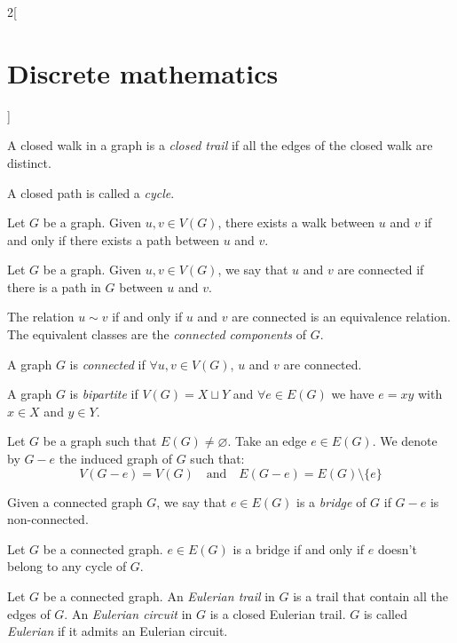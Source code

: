 \documentclass[../../../main.tex]{subfiles}
\begin{document}
\begin{multicols}{2}[\section{Discrete mathematics}]
\begin{definition}
    A closed walk in a graph is a \emph{closed trail} if all the edges of the closed walk are distinct.
  \end{definition}
  \begin{definition}
    A closed path is called a \emph{cycle}.
  \end{definition}
  \begin{prop}
    Let $G$ be a graph. Given $u,v\in V(G)$, there exists a walk between $u$ and $v$ if and only if there exists a path between $u$ and $v$.
  \end{prop}
  \begin{definition}
    Let $G$ be a graph. Given $u,v\in V(G)$, we say that $u$ and $v$ are connected if there is a path in $G$ between $u$ and $v$.
  \end{definition}
  \begin{prop}
    The relation $u\sim v$ if and only if $u$ and $v$ are connected is an equivalence relation. The equivalent classes are the \emph{connected components} of $G$.
  \end{prop}
  \begin{definition}
    A graph $G$ is \emph{connected} if $\forall u,v\in V(G)$, $u$ and $v$ are connected.
  \end{definition}
  \begin{definition}
    A graph $G$ is \emph{bipartite} if $V(G)=X\sqcup Y$ and $\forall e\in E(G)$ we have $e=xy$ with $x\in X$ and $y\in Y$.
  \end{definition}
  \begin{definition}
    Let $G$ be a graph such that $E(G)\ne\varnothing$. Take an edge $e\in E(G)$. We denote by $G-e$ the induced graph of $G$ such that: $$V(G-e)=V(G)\quad\text{and}\quad E(G-e)=E(G)\setminus\{e\}$$
  \end{definition}
  \begin{definition}
    Given a connected graph $G$, we say that $e\in E(G)$ is a \emph{bridge} of $G$ if $G-e$ is non-connected.
  \end{definition}
  \begin{prop}
    Let $G$ be a connected graph. $e\in E(G)$ is a bridge if and only if $e$ doesn't belong to any cycle of $G$.
  \end{prop}
  \begin{definition}
    Let $G$ be a connected graph. An \emph{Eulerian trail} in $G$ is a trail that contain all the edges of $G$. An \emph{Eulerian circuit} in $G$ is a closed Eulerian trail. $G$ is called \emph{Eulerian} if it admits an Eulerian circuit.

\end{definition}
\end{multicols}
\end{document}
